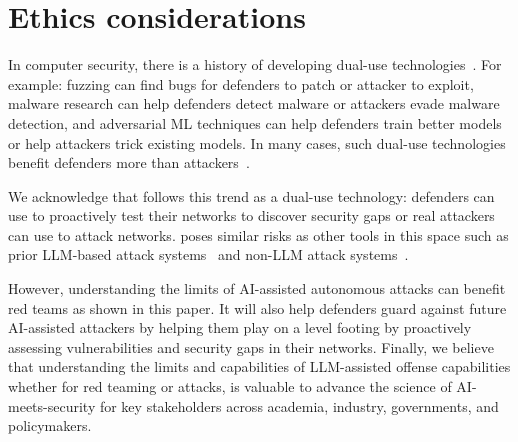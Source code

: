 \section*{Ethics considerations}
\label{sec:ethics}

In computer security, there is a history of developing dual-use technologies~\cite{silic2013dual, rad2015sword}.
For example: fuzzing can find bugs for defenders to patch or attacker to exploit, malware research can help defenders detect malware or attackers evade malware detection, and adversarial ML techniques can help defenders train better models or help attackers trick existing models.
In many cases, such dual-use technologies benefit defenders more than attackers~\cite{silic2013dual, rad2015sword}.

We acknowledge that \sys follows this trend as a dual-use technology: defenders can use \sys to proactively test their networks to discover security gaps or real attackers can use \sys to attack networks.
\sys poses similar risks as other tools in this space such as prior LLM-based attack systems~\cite{zhang2024cybench, pentestgpt, mayoral2025cai, wang2025cybergym} and non-LLM attack systems~\cite{caldera, cobalt, enoch2020harmer, merlin}.

However, understanding the limits of AI-assisted autonomous attacks can benefit red teams as shown in this paper.
It will also help defenders guard against future AI-assisted attackers by helping them play on a level footing by proactively assessing vulnerabilities and security gaps in their networks.
Finally, we believe that understanding the limits and capabilities of LLM-assisted offense capabilities whether for red teaming  or attacks, is valuable to advance the science of AI-meets-security for key stakeholders across academia, industry, governments, and policymakers.

